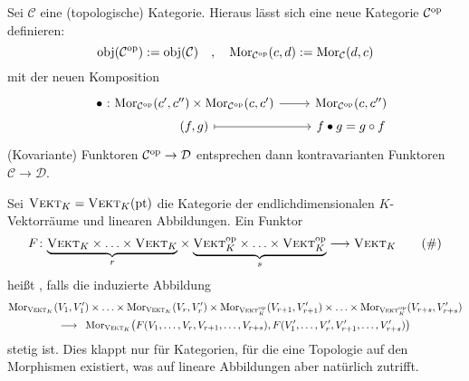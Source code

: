 \bigskip

\noindent Sei $\mathcal{C}$ eine (topologische) Kategorie. Hieraus lässt sich eine neue Kategorie $\mathcal{C}^{\mathrm{op}}$ definieren:
\[
	\operatorname{obj}(\mathcal{C}^{\mathrm{op}}) := \operatorname{obj}(\mathcal{C}) \quad , \quad \operatorname{Mor}_{\mathcal{C}^{\mathrm{op}}}(c,d) := \operatorname{Mor}_{\mathcal{C}}(d,c)
\]
mit der neuen Komposition
\[
	\begin{tikzcd}[row sep=0.1em]
		\bullet \mbox{ :}\hspace{-4em} & \Mor_{\mathcal{C}^\op}(c',c'') \times \Mor_{\mathcal{C}^\op}(c,c') \rar & \Mor_{\mathcal{C}^\op}(c,c'') \\
		& (f,g) \rar[mapsto] & f \bullet g = g \circ f
	\end{tikzcd}
\]
(Kovariante) Funktoren $\mathcal{C}^{\mathrm{op}} \to \mathcal{D}$ entsprechen dann kontravarianten Funktoren $\mathcal{C}\to \mathcal{D}$. 

Sei $\textsc{Vekt}_K = \textsc{Vekt}_K(\mathrm{pt})$ die Kategorie der endlichdimensionalen $K$-Vektorräume und linearen Abbildungen. Ein Funktor
\begin{equation}
	F \colon {\underbrace{\textsc{Vekt}_K \times \ldots \times \textsc{Vekt}_K}_{r}} \times {\underbrace{\textsc{Vekt}_K^{\mathrm{op}}\times \ldots \times \textsc{Vekt}_K^{\mathrm{op}}}_{s}} \longrightarrow \textsc{Vekt}_K \label{eq:24}\tag{\#}
\end{equation}
heißt , falls die induzierte Abbildung
\begin{gather*}
	\Mor_{\VEKT_K}(V_1,V'_1) \times \ldots \times \Mor_{\VEKT_K}(V_r,V'_r) \times \Mor_{\VEKT_K^\op}(V_{r+1},V'_{r+1}) \times \ldots \times \Mor_{\VEKT_K^\op}(V_{r+s},V'_{r+s}) \\
	\longrightarrow \enspace\Mor_{\VEKT_K} \enbrace*{F(V_1, \ldots,V_r,V_{r+1}, \ldots , V_{r+s}), F (V'_1, \ldots , V'_r, V'_{r+1}, \ldots , V'_{r+s})} 
\end{gather*}
stetig ist. Dies klappt nur für Kategorien, für die eine Topologie auf den Morphismen existiert, was auf lineare Abbildungen aber natürlich zutrifft.

